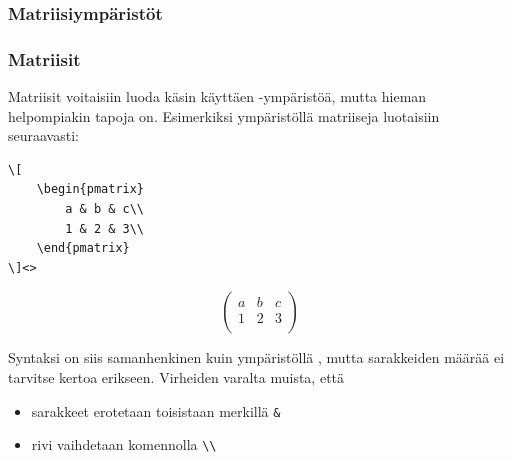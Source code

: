 \subsubsection{Matriisiympäristöt}
\begin{frame}[fragile]
    \frametitle{Matriisit}
    Matriisit voitaisiin luoda käsin käyttäen -ympäristöä, mutta hieman helpompiakin tapoja on. Esimerkiksi ympäristöllä  matriiseja luotaisiin seuraavasti:

    \begin{minipage}{5cm}
        \begin{lstlisting}
\[
    \begin{pmatrix}
        a & b & c\\
        1 & 2 & 3\\
    \end{pmatrix}
\]<>
        \end{lstlisting}
    \end{minipage}
    \begin{minipage}{5cm}
        \[
            \begin{pmatrix}
                a & b & c\\
                1 & 2 & 3\\
            \end{pmatrix}
        \]
    \end{minipage}

    Syntaksi on siis samanhenkinen kuin ympäristöllä , mutta sarakkeiden määrää ei tarvitse kertoa erikseen. Virheiden varalta muista, että
    \begin{itemize}
        \item sarakkeet erotetaan toisistaan merkillä \lstinline-&-
        \item rivi vaihdetaan komennolla \lstinline-\\-
    \end{itemize}

\end{frame}

\begin{frame}[fragile]
    
\end{frame}

